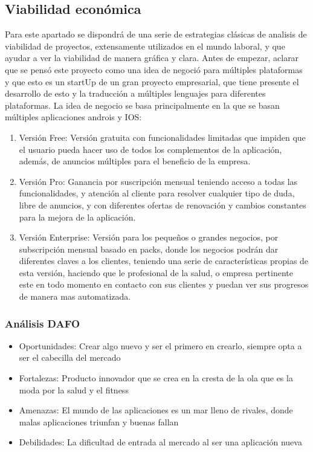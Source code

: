 \subsection{Viabilidad económica}
Para este apartado se dispondrá de una serie de estrategias clásicas de analisis de viabilidad de proyectos, extensamente utilizados en el mundo laboral, y que ayudar a ver la viabilidad de manera gráfica y clara.
Antes de empezar,  aclarar que se pensó este proyecto como una idea de negoció para múltiples plataformas y que esto es un startUp de un gran proyecto empresarial, que tiene presente el desarrollo de esto y la traducción a múltiples lenguajes para diferentes plataformas.
La idea de negocio se basa principalmente en la que se basan múltiples aplicaciones androis y IOS:
\begin{enumerate}
\item Versión Free: Versión gratuita con funcionalidades limitadas que impiden que el usuario pueda hacer uso de todos los complementos de la aplicación, además, de anuncios múltiples para el beneficio de la empresa.
\item Versión Pro: Ganancia por suscripción mensual teniendo acceso a todas las funcionalidades, y atención al cliente para resolver cualquier tipo de duda, libre de anuncios, y con diferentes ofertas de renovación y cambios constantes para la mejora de la aplicación.
\item Versión Enterprise: Versión para los pequeños o grandes negocios, por subscripción mensual basado en packs, donde los negocios podrán dar diferentes claves a los clientes, teniendo una serie de características propias de esta versión, haciendo que le profesional de la salud, o empresa pertinente este en todo momento en contacto con sus clientes y puedan ver sus progresos de manera mas automatizada.
\end{enumerate}
\subsubsection{Análisis DAFO}
\begin{itemize}
\item Oportunidades: Crear algo nuevo y ser el primero en crearlo, siempre opta a ser el cabecilla del mercado
\item Fortalezas: Producto innovador que se crea en la cresta de la ola que es la moda por la salud y el fitness
\item Amenazas: El mundo de las aplicaciones es un mar lleno de rivales, donde malas aplicaciones triunfan y buenas fallan
\item Debilidades: La dificultad de entrada al mercado al ser una aplicación nueva	
\end{itemize}
